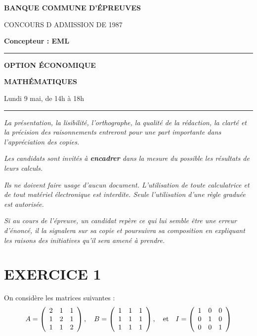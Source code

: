 \documentclass[11pt]{article}%
\begin{document}

\begin{center}
{\LARG\E\textbf{BANQUE COMMUNE D'ÉPREUVES}}



{\large \textsc{CONCOURS D ADMISSION DE 1987}}



{\large \textbf{Concepteur : EML}}



\rule{2.39cm}{0.05cm}



{\Large \textbf{OPTION ÉCONOMIQUE}}



{\Large \textbf{MATHÉMATIQUES }}



{\Large Lundi 9 mai, de 14h à 18h}



\rule{2.39cm}{0.05cm}
\end{center}

\textit{La présentation, la lisibilité, l'orthographe, la qualité
de la rédaction, la clarté et la précision des raisonnements
entreront pour une part importante dans l'appréciation des copies.}

\textit{Les candidats sont invités à \textbf{encadrer} dans la mesure
du possible les résultats de leurs calculs.}

\textit{Ils ne doivent faire usage d'aucun document. L'utilisation de
toute
calculatrice et de tout matériel électronique est interdite. Seule
l'utilisation d'une règle graduée est autorisée.}

\textit{Si au cours de l'épreuve, un candidat repère ce qui lui semble
être une erreur d'énoncé, il la signalera sur sa copie et
poursuivra sa composition en expliquant les raisons des initiatives
qu'il sera
amené à prendre.}

\vspace*{3cm}

\section*{EXERCICE 1}

On considère les matrices suivantes : 
\[
A = \left( 
\begin{array}{ccc}
2 & 1 & 1 \\
1 & 2 & 1 \\
1 & 1 & 2
\end{array}
\right),\quad B = \left( 
\begin{array}{ccc}
1 & 1 & 1 \\
1 & 1 & 1 \\
1 & 1 & 1
\end{array}
\right),\quad \text{et\quad }I = \left( 
\begin{array}{ccc}
1 & 0 & 0 \\
0 & 1 & 0 \\
0 & 0 & 1
\end{array}
\right) 
\]
\end{document}
